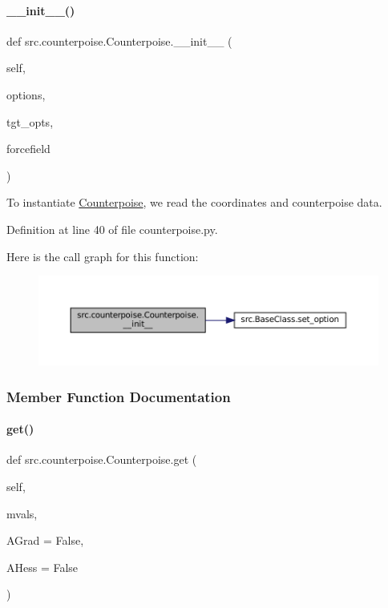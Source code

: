 \paragraph{\texorpdfstring{\+\_\+\+\_\+init\+\_\+\+\_\+()}{\_\_init\_\_()}}
{\footnotesize\ttfamily def src.\+counterpoise.\+Counterpoise.\+\_\+\+\_\+init\+\_\+\+\_\+ (\begin{DoxyParamCaption}\item[{}]{self,  }\item[{}]{options,  }\item[{}]{tgt\+\_\+opts,  }\item[{}]{forcefield }\end{DoxyParamCaption})}



To instantiate \hyperlink{classsrc_1_1counterpoise_1_1Counterpoise}{Counterpoise}, we read the coordinates and counterpoise data. 



Definition at line 40 of file counterpoise.\+py.

Here is the call graph for this function\+:
\nopagebreak
\begin{figure}[H]
\begin{center}
\leavevmode
\includegraphics[width=350pt]{classsrc_1_1counterpoise_1_1Counterpoise_ae6afcfe82039112c68507ef5e5e32f83_cgraph}
\end{center}
\end{figure}


\subsubsection{Member Function Documentation}
\mbox{\label{classsrc_1_1counterpoise_1_1Counterpoise_a87c8e02ded9adab8ecf74d64befdd5e6}} 
\paragraph{\texorpdfstring{get()}{get()}}
{\footnotesize\ttfamily def src.\+counterpoise.\+Counterpoise.\+get (\begin{DoxyParamCaption}\item[{}]{self,  }\item[{}]{mvals,  }\item[{}]{A\+Grad = {\ttfamily False},  }\item[{}]{A\+Hess = {\ttfamily False} }\end{DoxyParamCaption})}



